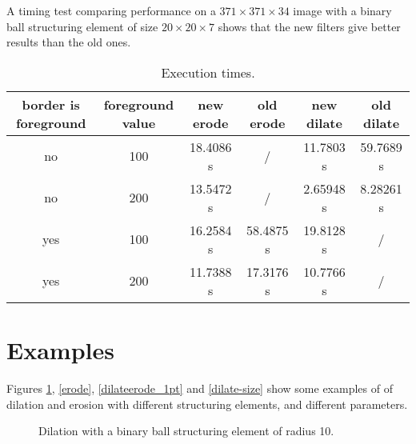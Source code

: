\documentclass{InsightArticle}
\begin{document}
A timing test comparing performance on a $371 \times 371 \times 34$
image with a binary ball structuring element of size $20 \times 20 \times 7$ shows
that the new filters give better results than the old ones.

\begin{table}[htbp]
\centering
\begin{tabular}{cccccc}
\hline
border is foreground & foreground value & new erode & old erode & new dilate & old dilate \\
\hline
\hline
no & 100 & 18.4086 s & / & 11.7803 s & 59.7689 s \\
no & 200 & 13.5472 s & / & 2.65948 s & 8.28261 s\\
yes & 100 & 16.2584 s & 58.4875 s & 19.8128 s & /\\
yes & 200 & 11.7388 s & 17.3176 s & 10.7766 s & /\\
\hline
\end{tabular}
\caption{Execution times.\label{perf}}
\end{table}

\section{Examples}

Figures \ref{dilate}, \ref{erode}, \ref{dilateerode_1pt} and \ref{dilate-size} show some examples of
of dilation and erosion with different structuring elements, and different parameters.

\begin{figure}[htbp]
\begin{center}
\caption{Dilation with a binary ball structuring element of radius 10.\label{dilate}}
\end{center}
\end{figure}
\end{document}

